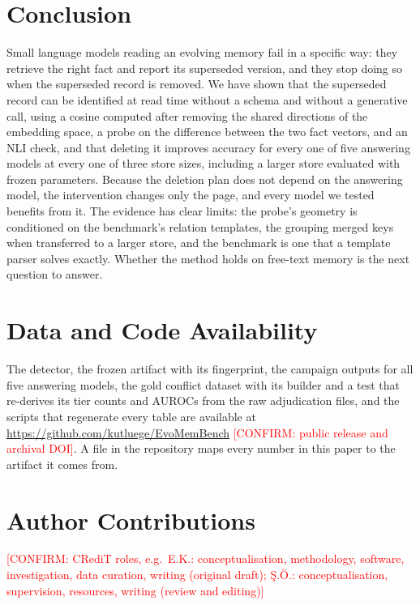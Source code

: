 \documentclass[journal=jcisd8,manuscript=article]{achemso}
\newcommand{\confirm}[1]{\textcolor{red}{[CONFIRM: #1]}} %
\begin{document}
\section{Conclusion}
\label{sec:conclusion}

Small language models reading an evolving memory fail in a specific way: they retrieve the right fact and report its superseded version, and they stop doing so when the superseded record is removed. We have shown that the superseded record can be identified at read time without a schema and without a generative call, using a cosine computed after removing the shared directions of the embedding space, a probe on the difference between the two fact vectors, and an NLI check, and that deleting it improves accuracy for every one of five answering models at every one of three store sizes, including a larger store evaluated with frozen parameters. Because the deletion plan does not depend on the answering model, the intervention changes only the page, and every model we tested benefits from it. The evidence has clear limits: the probe's geometry is conditioned on the benchmark's relation templates, the grouping merged keys when transferred to a larger store, and the benchmark is one that a template parser solves exactly. Whether the method holds on free-text memory is the next question to answer.

\section*{Data and Code Availability}

The detector, the frozen artifact with its fingerprint, the campaign outputs for all five answering models, the gold conflict dataset with its builder and a test that re-derives its tier counts and AUROCs from the raw adjudication files, and the scripts that regenerate every table are available at \url{https://github.com/kutluege/EvoMemBench} \confirm{public release and archival DOI}. A file in the repository maps every number in this paper to the artifact it comes from.

\section*{Author Contributions}

\confirm{CRediT roles, e.g.\ E.K.: conceptualisation, methodology, software, investigation, data curation, writing (original draft); \c{S}.\"O.: conceptualisation, supervision, resources, writing (review and editing)}
\end{document}
